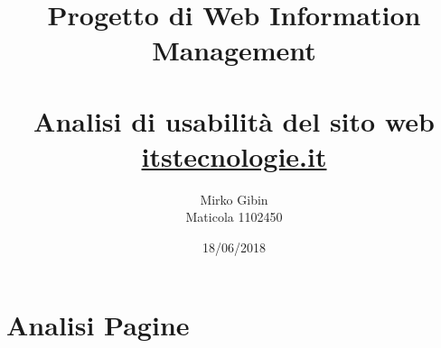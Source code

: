 \documentclass{article}
\author {Mirko Gibin \\ Maticola 1102450}
\date{18/06/2018}
\title {Progetto di Web Information Management \\ ~\\
\large Analisi di usabilità del sito web \\ \url{itstecnologie.it}}
\begin{document}
\maketitle
\tableofcontents
\newpage
	
	\newpage
	\section{Analisi Pagine}
	
	\newpage
	
	\newpage
	
\end{document}
